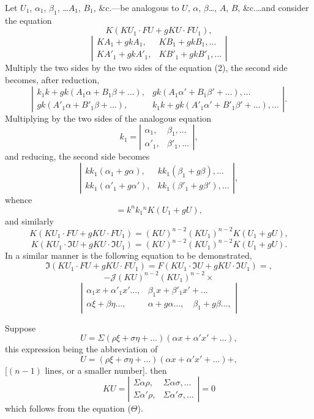 \documentclass[11pt,a4paper]{article}
\theoremstyle{plain}
\theoremstyle{definition}
\theoremstyle{remark}
\begin{document}
\newpage
Let $U_1$, $\alpha_1$, $\beta_1$, \ldots $A_1$, $B_1$, \&c.---be analogous to $U$, $\alpha$, $\beta$\ldots, $A$, $B$, \&c.\ldots and
consider the equation
\[
K(KU_1 \cdot FU + gKU \cdot FU_1) \tag{40},
\]
\[
\left|\begin{array}{cc}
KA_1 + gkA_1, & KB_1 + gkB_1, \ldots \\
KA'_1 + gkA'_1, & KB'_1 + gkB'_1, \ldots
\end{array}\right|
\]
Multiply the two sides by the two sides of the equation (2), the second side
becomes, after reduction,
\[
\left|\begin{array}{cc}
k_1k + gk(A_1\alpha + B_1\beta + \ldots), & gk(A_1\alpha' + B_1\beta' + \ldots), \ldots \\
gk(A'_1\alpha + B'_1\beta + \ldots), & k_1k + gk(A'_1\alpha' + B'_1\beta' + \ldots), \ldots
\end{array}\right|
\tag{41}.
\]
Multiplying by the two sides of the analogous equation
\[
k_1 = \left|\begin{array}{cc}
\alpha_1, & \beta_1, \ldots \\
\alpha'_1, & \beta'_1, \ldots
\end{array}\right|
\tag{42},
\]
and reducing, the second side becomes
\[
\left|\begin{array}{cc}
kk_1(\alpha_1 + g\alpha), & kk_1(\beta_1 + g\beta), \ldots \\
kk_1(\alpha'_1 + g\alpha'), & kk_1(\beta'_1 + g\beta'), \ldots
\end{array}\right|
\tag{43},
\]
whence
\[
= k^n k_1{}^n K(U_1 + gU) \tag{44},
\]
and similarly
\[
K(KU_1 \cdot FU + gKU \cdot FU_1) = (KU)^{n-2}(KU_1)^{n-2}K(U_1 + gU) \tag{45},
\]
\[
K(KU_1 \cdot \mathfrak{I}U + gKU \cdot \mathfrak{I}U_1) = (KU)^{n-2}(KU_1)^{n-2}K(U_1 + gU) \tag{46}.
\]
In a similar manner is the following equation to be demonstrated,
\[
\mathfrak{I}(KU_1 \cdot FU + gKU \cdot FU_1) = F(KU_1 \cdot \mathfrak{I}U + gKU \cdot \mathfrak{I}U_1) =
\tag{47},
\]
\[
-\mathcal{J}(KU)^{n-2}(KU_1)^{n-2} \times
\]
\[
\left|\begin{array}{cc}
\alpha_1 x + \alpha'_1 x' \ldots, & \beta_1 x + \beta'_1 x' + \ldots \\
\alpha\xi + \beta\eta \ldots, & \alpha + g\alpha \ldots, \quad \beta_1 + g\beta \ldots,
\end{array}\right|
\]

\newpage
Suppose
\[
U = \Sigma(\rho\xi + \sigma\eta + \ldots)(\alpha x + \alpha'x' + \ldots)
\tag{48},
\]
this expression being the abbreviation of
\[
U = (\rho\xi + \sigma\eta + \ldots)(\alpha x + \alpha'x' + \ldots) +
\tag{49},
\]
[$(n-1)$ lines, or a smaller number].
then
\[
KU = \left|\begin{array}{cc}
\Sigma\alpha\rho, & \Sigma\alpha\sigma, \ldots \\
\Sigma\alpha'\rho, & \Sigma\alpha'\sigma, \ldots
\end{array}\right| = 0
\]
which follows from the equation ($\Theta$).
\end{document}
